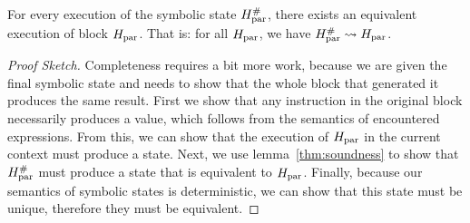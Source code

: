 {%




\begin{lemma}\label{thm:completeness}
  For every execution of the symbolic state $H_\text{par}^{\#}$, there
  exists an equivalent execution of block $H_\text{par}$. That is: for all $H_\text{par}$, we have $H_\text{par}^{\#} \mathrel{\leadsto} H_\text{par}$.

  \begin{proof}[Proof Sketch]
    Completeness requires a bit more work, because we are given the final
    symbolic state and needs to show that the whole block that generated it
    produces the same result.  First we show that any instruction in the original block necessarily
      produces a value, which follows from the semantics of encountered
      expressions.  From this, we can show that the execution of $H_\text{par}$ in the
      current context must produce a state. Next, we use lemma~\ref{thm:soundness} to show that $H_\text{par}^{\#}$
      must produce a state that is equivalent to $H_\text{par}$. Finally, because our semantics of symbolic states is deterministic, we can show that this
      state must be unique, therefore they must be equivalent.
  \end{proof}
\end{lemma}



}
